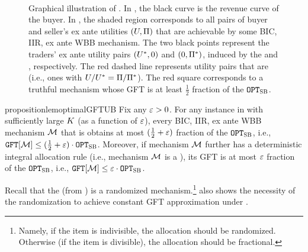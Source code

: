 \begin{figure}
    \centering
    \subfloat[]{

\label{fig:all fair mech:irregular:revenue curve}
}~~~~
    \subfloat[]{

\label{fig:all fair mech:irregular:ex ante utility pair}
}
    \caption{Graphical illustration of . In , the black curve is the revenue curve of the buyer. In , the shaded region corresponds to all pairs of buyer and seller's ex ante utilities $(U,\Pi)$ that are achievable by some BIC, IIR, ex ante WBB mechanism. The two black points represent the traders' ex ante utility pairs $(U^*,0)$ and $(0,\Pi^*)$, induced by the {\BuyerOffer} and {\SellerOffer}, respectively. The red dashed line represents utility pairs that are {\ksfair} (i.e., ones with $U/U^* = \Pi/\Pi^*$). The red square corresponds to a truthful {\ksfair} mechanism whose GFT is at least $\frac{1}{2}$ fraction of the {\SecondBest} $\texttt{OPT}_{\textsc{SB}}$.}
    \label{fig:all fair mech:irregular}
\end{figure}


\begin{restatable}{proposition}{lemoptimalGFTUB}
\label{lem:optimal GFT upper bound:irregular}
    Fix any $\varepsilon > 0$.
    For any instance in  with sufficiently large $K$ (as a function of $\varepsilon$), every BIC, IIR, ex ante WBB mechanism $\mathcal{M}$ that is {\ksfair} obtains at most $(\frac{1}{2} + \varepsilon)$ fraction of the {\SecondBest} $\texttt{OPT}_{\textsc{SB}}$, i.e., $\GFT{\mech} \leq (\frac{1}{2} + \eps) \cdot \OPTSB$. Moreover, if mechanism $\mathcal{M}$ further has a deterministic integral allocation rule (i.e., mechanism $\mathcal{M}$ is a {\FixPrice}), its GFT is at most $\varepsilon$ fraction of the {\SecondBest} $\texttt{OPT}_{\textsc{SB}}$, i.e., $\GFT{\mech}\leq \eps\cdot \OPTSB$. 
\end{restatable}
Recall that the {\ksfair} {\BiasedRandomOffer} (from ) is a randomized mechanism.\footnote{Namely, if the item is indivisible, the allocation should be randomized. Otherwise (if the item is divisible), the allocation should be fractional.}  also shows the necessity of the randomization to achieve constant GFT approximation under {\ksfairness}. 

